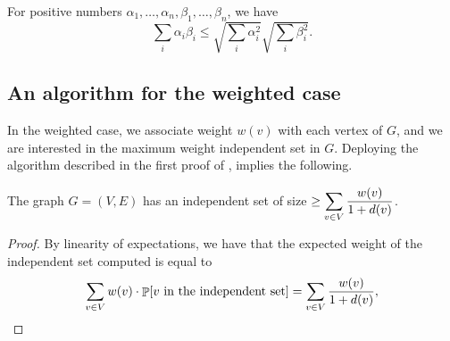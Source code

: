 \begin{lemma}
    For positive numbers $\alpha_1, \ldots, \alpha_n, \beta_1, \ldots,
    \beta_n$, we have
    \begin{equation*}
        \sum_{i} \alpha_i \beta_i \leq \sqrt{\sum_i \alpha_i^2}
        \sqrt{\sum_i \beta_i^2} .
    \end{equation*}

\end{lemma}

\subsection{An algorithm for the weighted case}

In the weighted case, we associate weight $w(v)$ with each vertex of
$G$, and we are interested in the maximum weight independent set in
$G$. Deploying the algorithm described in the first proof of
, implies the following.

\begin{lemma}
    The graph $G=(V,E)$ has an independent set of size $\displaystyle \geq
    \sum_{v \in V} \frac{w(v)}{1+d(v)}$.
\end{lemma}
\begin{proof}
    By linearity of expectations, we have that the expected weight of
    the independent set computed is equal to
    \begin{equation*}
        \sum_{v \in V} w(v) \cdot \Prob{v \text{ in the independent set}}
        = \sum_{v \in V} \frac{w(v)}{1+d(v)},        
    \end{equation*}
\end{proof}


\nocite{mr-ra-95}

\ChapterEnd{}
